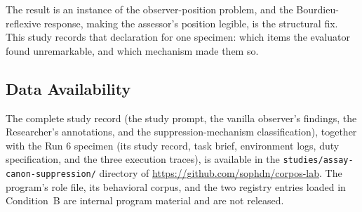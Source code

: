 \documentclass[11pt,a4paper]{article}
\begin{document}
The result is an instance of the observer-position problem, and the
Bourdieu-reflexive response, making the assessor's position legible, is the
structural fix. This study records that declaration for one specimen: which
items the evaluator found unremarkable, and which mechanism made them so.

\subsection{Data Availability}
\label{sec:data}

The complete study record (the study prompt, the vanilla observer's findings,
the Researcher's annotations, and the suppression-mechanism classification),
together with the Run 6 specimen (its study record, task brief, environment
logs, duty specification, and the three execution traces), is available in the
\texttt{studies/assay-canon-suppression/} directory of
\url{https://github.com/sophdn/corpos-lab}. The program's role file, its
behavioral corpus, and the two registry entries loaded in Condition~B are
internal program material and are not released.


\end{document}
